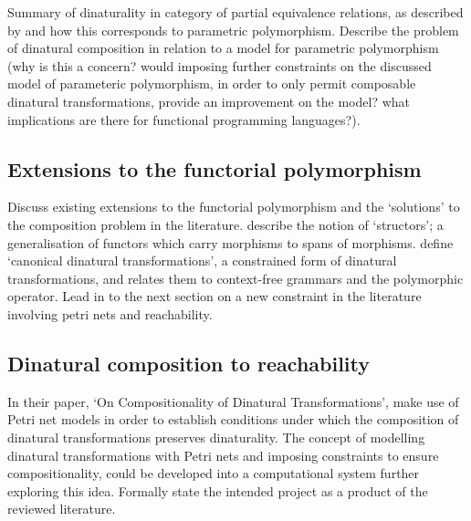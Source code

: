 \documentclass[11pt,openright,hidelinks,a4paper]{article}
\begin{document}
Summary of dinaturality in category of partial equivalence relations, as described by  and how this corresponds to parametric polymorphism.
\newline\newline
Describe the problem of dinatural composition in relation to a model for parametric polymorphism (why is this a concern? would imposing further constraints on the discussed model of parameteric polymorphism, in order to only permit composable dinatural transformations, provide an improvement on the model? what implications are there for functional programming languages?).

\subsection{Extensions to the functorial polymorphism}
Discuss existing extensions to the functorial polymorphism and the `solutions' to the composition problem in the literature.
\newline\newline
{} describe the notion of `structors'; a generalisation of functors which carry morphisms to spans of morphisms.
\newline\newline
{} define `canonical dinatural transformations', a constrained form of dinatural transformations, and relates them to context-free grammars and the polymorphic operator.
\newline\newline
Lead in to the next section on a new constraint in the literature involving petri nets and reachability.

\subsection{Dinatural composition to reachability}
In their paper, `On Compositionality of Dinatural Transformations',  make use of Petri net models in order to establish conditions under which the composition of dinatural transformations preserves dinaturality. The concept of modelling dinatural transformations with Petri nets and imposing constraints to ensure compositionality, could be developed into a computational system further exploring this idea.
\newline\newline
Formally state the intended project as a product of the reviewed literature.


\newpage

\end{document}
